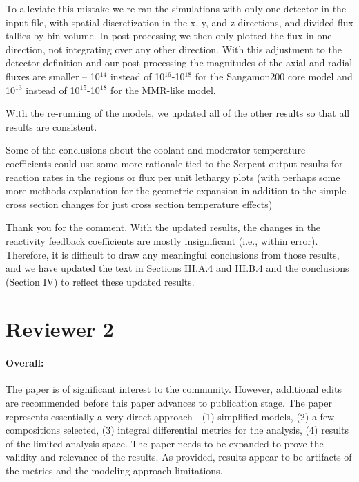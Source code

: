 \documentclass[answers,11pt]{exam}
\begin{document}
\begin{questions}
\begin{solution}
                To alleviate this mistake we re-ran the simulations with only 
                one detector in the input file, with spatial discretization 
                in the x, y, and z directions, and divided flux tallies by bin volume. In post-processing we then only 
                plotted the flux in one direction, not integrating over any other 
                direction. With this adjustment to the detector definition and 
                our post processing the magnitudes of the axial and radial 
                fluxes are smaller -- 
                10$^{14}$ instead of 10$^{16}$-10$^{18}$ for the Sangamon200 
                core model and 10$^{13}$ instead of 10$^{15}$-10$^{18}$ for the 
                MMR-like model. 

                With the re-running of the models, we updated all of the other 
                results so that all results are consistent. 
                
        \end{solution}

        \question Some of the conclusions about the coolant and moderator temperature
	coefficients could use some more rationale tied to the Serpent output results
	for reaction rates in the regions or flux per unit lethargy plots (with perhaps
	some more methods explanation for the geometric expansion in addition to the
	simple cross section changes for just cross section temperature effects)
	 \begin{solution}
                Thank you for the comment. With the updated 
                results, the changes in the reactivity 
                feedback coefficients are mostly 
                insignificant (i.e., within error). 
                Therefore, it is difficult to draw any 
                meaningful conclusions from those results, 
                and we have updated the text in Sections 
                III.A.4 and III.B.4 and the conclusions 
                (Section IV) to reflect these updated 
                results. 

	 \end{solution}
\end{questions} 


\section*{Reviewer 2}
\paragraph{Overall: } The paper is of significant interest to the community.
However, additional edits are recommended before this paper advances to
publication stage.
The paper represents essentially a very direct approach - (1) simplified
models, (2) a few compositions selected, (3) integral differential metrics for
the analysis, (4) results of the limited analysis space. The paper needs to be
expanded to prove the validity and relevance of the results. As provided,
results appear to be artifacts of the metrics and the modeling approach
limitations.
\end{document}
